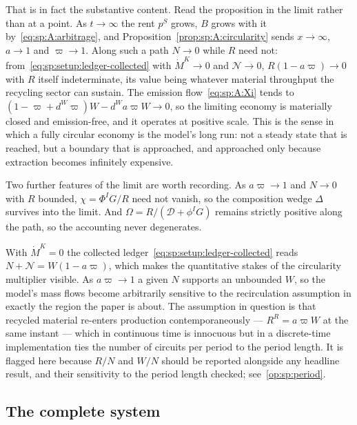 That is in fact the substantive content. Read the proposition in the limit rather than at a point. As
$t\to\infty$ the rent $p^S$ grows, $B$ grows with it by~\eqref{eq:sp:A:arbitrage}, and
Proposition~\ref{prop:sp:A:circularity} sends $x\to\infty$, $a\to1$ and $\varpi\to1$. Along such a
path $N\to0$ while $R$ need not: from~\eqref{eq:sp:setup:ledger-collected} with $\dot M^K\to0$ and
$\mathcal N\to0$, $R\left(1-a\varpi\right)\to0$ with $R$ itself indeterminate, its value being
whatever material throughput the recycling sector can sustain. The emission
flow~\eqref{eq:sp:A:Xi} tends to $\left(1-\varpi+d^W\varpi\right)W-d^Wa\varpi W\to0$, so the limiting
economy is materially closed and emission-free, and it operates at positive scale. This is the sense
in which a fully circular economy is the model's long run: not a steady state that is reached, but a
boundary that is approached, and approached only because extraction becomes infinitely expensive.

Two further features of the limit are worth recording. As $a\varpi\to1$ and $N\to0$ with $R$ bounded,
$\chi=\Phi^IG/R$ need not vanish, so the composition wedge $\Delta$ survives into the limit. And
$\Omega=R/\left(\mathcal D+\phi^IG\right)$ remains strictly positive along the path, so the
accounting never degenerates.

 With $\dot M^K=0$ the collected
ledger~\eqref{eq:sp:setup:ledger-collected} reads $N+\mathcal N=W\left(1-a\varpi\right)$, which makes
the quantitative stakes of the circularity multiplier visible. As $a\varpi\to1$ a given $N$ supports
an unbounded $W$, so the model's mass flows become arbitrarily sensitive to the recirculation
assumption in exactly the region the paper is about. The assumption in question is that recycled
material re-enters production contemporaneously --- $R^R=a\varpi W$ at the same instant --- which in
continuous time is innocuous but in a discrete-time implementation ties the number of circuits per
period to the period length. It is flagged here because $R/N$ and $W/N$ should be reported alongside
any headline result, and their sensitivity to the period length checked; see~\ref{op:sp:period}.


\subsection{The complete system}\label{sec:sp:A:system}

